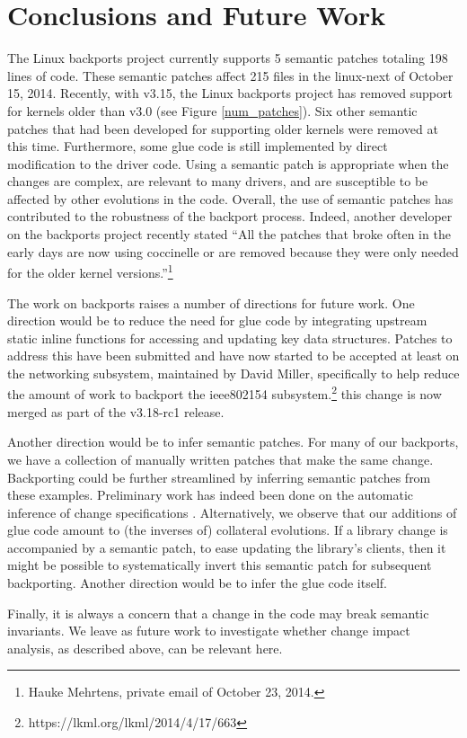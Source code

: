 \section{Conclusions and Future Work}
\label{concl}

The Linux backports project currently supports 5 semantic patches totaling
198 lines of code.  These semantic patches affect 215 files in the
linux-next of October 15, 2014.  Recently, with v3.15, the Linux backports
project has removed support for kernels older than v3.0 (see Figure
\ref{num_patches}).  Six other semantic patches that had been developed for
supporting older kernels were removed at this time.  Furthermore, some glue
code is still implemented by direct modification to the driver code.  Using
a semantic patch is appropriate when the changes are complex, are relevant
to many drivers, and are susceptible to be affected by other evolutions in
the code.  Overall, the use of semantic patches has contributed to the
robustness of the backport process.  Indeed, another developer on the
backports project recently stated ``All the patches that broke often in the
early days are now using coccinelle or are removed because they were only
needed for the older kernel versions.''\footnote{Hauke Mehrtens, private
  email of October 23, 2014.}

The work on backports raises a number of directions for future work.  One
direction would be to reduce the need for glue code by integrating upstream
static inline functions for accessing and updating key data structures.
Patches to address this have been submitted and have now started to be
accepted at least on the networking subsystem, maintained by David Miller,
specifically to help reduce the amount of work to backport the ieee802154
subsystem.\footnote{https://lkml.org/lkml/2014/4/17/663} this change is now
merged as part of the v3.18-rc1 release.

Another direction would be to infer semantic patches.  For many of our
backports, we have a collection of manually written patches that make the
same change.  Backporting could be further streamlined by inferring
semantic patches from these examples.  Preliminary work has indeed been
done on the automatic inference of change specifications
\cite{jAndersenAse2008,Meng:13}.  Alternatively, we observe that our
additions of glue code amount to (the inverses of) collateral evolutions.
If a library change is accompanied by a semantic patch, to ease updating
the library's clients, then it might be possible to systematically invert
this semantic patch for subsequent backporting.  Another direction would be
to infer the glue code itself.

Finally, it is always a concern that a change in the code may break
semantic invariants.  We leave as future work to investigate whether change
impact analysis, as described above, can be relevant here.


